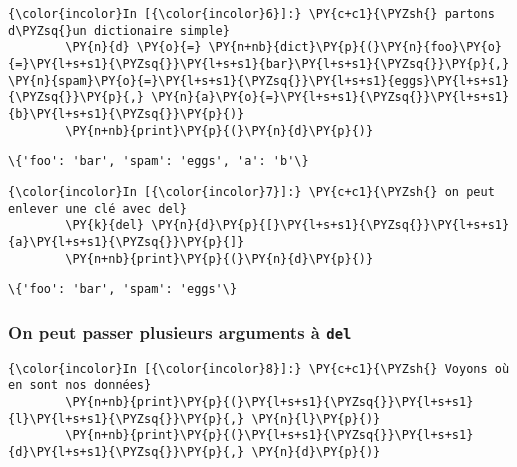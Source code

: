     \begin{Verbatim}[commandchars=\\\{\},frame=single,framerule=0.3mm,rulecolor=\color{cellframecolor}]
{\color{incolor}In [{\color{incolor}6}]:} \PY{c+c1}{\PYZsh{} partons d\PYZsq{}un dictionaire simple}
        \PY{n}{d} \PY{o}{=} \PY{n+nb}{dict}\PY{p}{(}\PY{n}{foo}\PY{o}{=}\PY{l+s+s1}{\PYZsq{}}\PY{l+s+s1}{bar}\PY{l+s+s1}{\PYZsq{}}\PY{p}{,} \PY{n}{spam}\PY{o}{=}\PY{l+s+s1}{\PYZsq{}}\PY{l+s+s1}{eggs}\PY{l+s+s1}{\PYZsq{}}\PY{p}{,} \PY{n}{a}\PY{o}{=}\PY{l+s+s1}{\PYZsq{}}\PY{l+s+s1}{b}\PY{l+s+s1}{\PYZsq{}}\PY{p}{)}
        \PY{n+nb}{print}\PY{p}{(}\PY{n}{d}\PY{p}{)}
\end{Verbatim}


    \begin{Verbatim}[commandchars=\\\{\},frame=single,framerule=0.3mm,rulecolor=\color{cellframecolor}]
\{'foo': 'bar', 'spam': 'eggs', 'a': 'b'\}
\end{Verbatim}

    \begin{Verbatim}[commandchars=\\\{\},frame=single,framerule=0.3mm,rulecolor=\color{cellframecolor}]
{\color{incolor}In [{\color{incolor}7}]:} \PY{c+c1}{\PYZsh{} on peut enlever une clé avec del}
        \PY{k}{del} \PY{n}{d}\PY{p}{[}\PY{l+s+s1}{\PYZsq{}}\PY{l+s+s1}{a}\PY{l+s+s1}{\PYZsq{}}\PY{p}{]}
        \PY{n+nb}{print}\PY{p}{(}\PY{n}{d}\PY{p}{)}
\end{Verbatim}


    \begin{Verbatim}[commandchars=\\\{\},frame=single,framerule=0.3mm,rulecolor=\color{cellframecolor}]
\{'foo': 'bar', 'spam': 'eggs'\}
\end{Verbatim}

    \hypertarget{on-peut-passer-plusieurs-arguments-uxe0-del}{%
\subsubsection{\texorpdfstring{On peut passer plusieurs arguments à
\texttt{del}}{On peut passer plusieurs arguments à del}}\label{on-peut-passer-plusieurs-arguments-uxe0-del}}

    \begin{Verbatim}[commandchars=\\\{\},frame=single,framerule=0.3mm,rulecolor=\color{cellframecolor}]
{\color{incolor}In [{\color{incolor}8}]:} \PY{c+c1}{\PYZsh{} Voyons où en sont nos données}
        \PY{n+nb}{print}\PY{p}{(}\PY{l+s+s1}{\PYZsq{}}\PY{l+s+s1}{l}\PY{l+s+s1}{\PYZsq{}}\PY{p}{,} \PY{n}{l}\PY{p}{)}
        \PY{n+nb}{print}\PY{p}{(}\PY{l+s+s1}{\PYZsq{}}\PY{l+s+s1}{d}\PY{l+s+s1}{\PYZsq{}}\PY{p}{,} \PY{n}{d}\PY{p}{)}
\end{Verbatim}


